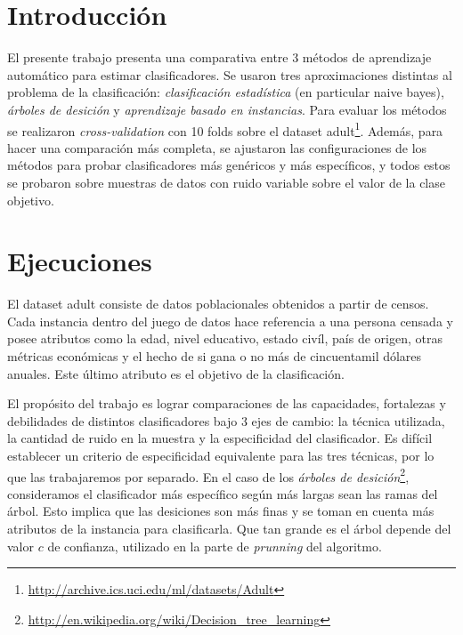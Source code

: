 \documentclass[a4paper,10pt]{article}
\begin{document}



\maketitle
\tableofcontents
\newpage

\section{Introducción}

El presente trabajo presenta una comparativa entre 3 métodos de aprendizaje automático para estimar clasificadores. Se usaron tres aproximaciones distintas al problema de la clasificación: \emph{clasificación estadística} (en particular \textsf{naive bayes}), \emph{árboles de desición} y \emph{aprendizaje basado en instancias}. Para evaluar los métodos se realizaron \emph{cross-validation} con 10 folds sobre el dataset \textsf{adult}\footnote{\url{http://archive.ics.uci.edu/ml/datasets/Adult}}. Además, para hacer una comparación más completa, se ajustaron las configuraciones de los métodos para probar clasificadores más genéricos y más específicos, y todos estos se probaron sobre muestras de datos con ruido variable sobre el valor de la clase objetivo. 

\section{Ejecuciones}

El dataset \textsf{adult} consiste de datos poblacionales obtenidos a partir de censos. Cada instancia dentro del juego de datos hace referencia a una persona censada y posee atributos como la edad, nivel educativo, estado civíl, país de origen, otras métricas económicas y el hecho de si gana o no más de cincuentamil dólares anuales. Este último atributo es el objetivo de la clasificación.

El propósito del trabajo es lograr comparaciones de las capacidades, fortalezas y debilidades de distintos clasificadores bajo 3 ejes de cambio: la técnica utilizada, la cantidad de ruido en la muestra y la especificidad del clasificador. Es difícil establecer un criterio de especificidad equivalente para las tres técnicas, por lo que las trabajaremos por separado. En el caso de los \emph{árboles de desición}\footnote{\url{http://en.wikipedia.org/wiki/Decision\_tree\_learning}}, consideramos el clasificador más específico según más largas sean las ramas del árbol. Esto implica que las desiciones son más finas y se toman en cuenta más atributos de la instancia para clasificarla. Que tan grande es el árbol depende del valor $c$ de confianza, utilizado en la parte de \emph{prunning} del algoritmo.
\end{document}
